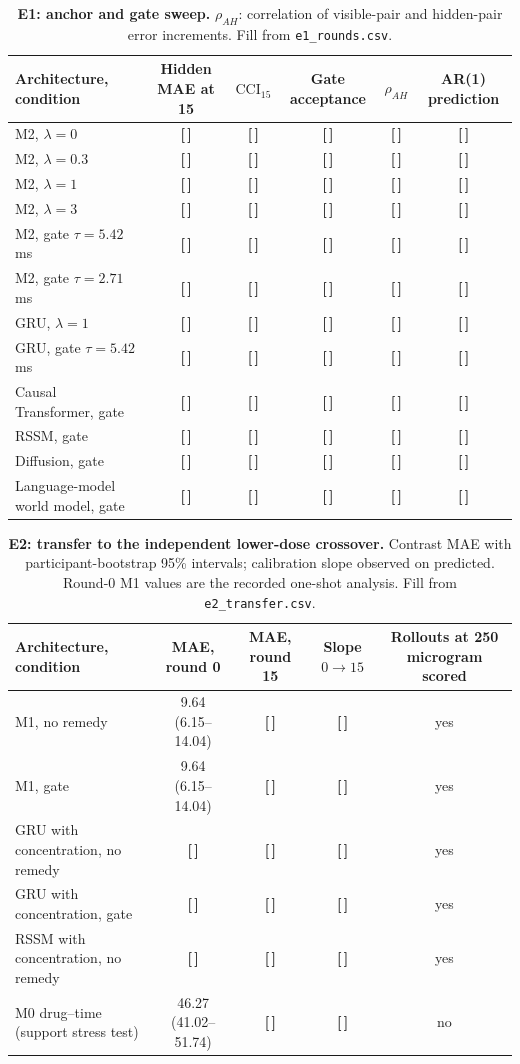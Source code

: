 \documentclass[11pt,a4paper]{article}
\newcommand{\T}{{\color{red}\textbf{[\,]}}}
\newcommand{\CCI}{\mathrm{CCI}}
\begin{document}
\begin{table}[!htbp]\centering\footnotesize
\caption{\textbf{E1: anchor and gate sweep.} $\rho_{AH}$: correlation of visible-pair and hidden-pair error increments. Fill from \texttt{e1\_rounds.csv}.}
\begin{tabularx}{\textwidth}{@{}p{3.9cm} C C C C C@{}}\toprule
Architecture, condition & Hidden MAE at 15 & $\CCI_{15}$ & Gate acceptance & $\rho_{AH}$ & AR(1) prediction\\\midrule
M2, $\lambda=0$ & \T & \T & \T & \T & \T\\
M2, $\lambda=0.3$ & \T & \T & \T & \T & \T\\
M2, $\lambda=1$ & \T & \T & \T & \T & \T\\
M2, $\lambda=3$ & \T & \T & \T & \T & \T\\
M2, gate $\tau=5.42$ ms & \T & \T & \T & \T & \T\\
M2, gate $\tau=2.71$ ms & \T & \T & \T & \T & \T\\
GRU, $\lambda=1$ & \T & \T & \T & \T & \T\\
GRU, gate $\tau=5.42$ ms & \T & \T & \T & \T & \T\\
Causal Transformer, gate & \T & \T & \T & \T & \T\\
RSSM, gate & \T & \T & \T & \T & \T\\
Diffusion, gate & \T & \T & \T & \T & \T\\
Language-model world model, gate & \T & \T & \T & \T & \T\\
\bottomrule\end{tabularx}
\end{table}
\FloatBarrier
\begin{table}[!htbp]\centering\footnotesize
\caption{\textbf{E2: transfer to the independent lower-dose crossover.} Contrast MAE with participant-bootstrap 95\% intervals; calibration slope observed on predicted. Round-0 M1 values are the recorded one-shot analysis. Fill from \texttt{e2\_transfer.csv}.}
\begin{tabularx}{\textwidth}{@{}p{3.9cm} C C C C@{}}\toprule
Architecture, condition & MAE, round 0 & MAE, round 15 & Slope $0\to15$ & Rollouts at 250 microgram scored\\\midrule
M1, no remedy & 9.64 (6.15--14.04) & \T & \T & yes\\
M1, gate & 9.64 (6.15--14.04) & \T & \T & yes\\
GRU with concentration, no remedy & \T & \T & \T & yes\\
GRU with concentration, gate & \T & \T & \T & yes\\
RSSM with concentration, no remedy & \T & \T & \T & yes\\
M0 drug--time (support stress test) & 46.27 (41.02--51.74) & \T & \T & no\\
\bottomrule\end{tabularx}
\end{table}
\end{document}

